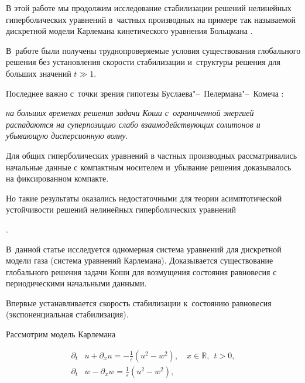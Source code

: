 \newpage




В этой работе мы продолжим исследование стабилизации решений нелинейных гиперболических уравнений в~частных производных на примере так называемой дискретной модели Карлемана кинетического уравнения Больцмана \cite{duh:GodSul, duh:Broad, duh:veden, duh:VasDukRad16, duh:Karlm, duh:Boltz, duh:RVD1, duh:God62, duh:Ily, duh:dux}. 

В~работе \cite{duh:Ily} были получены труднопроверяемые условия существования глобального решения без установления скорости стабилизации и~структуры решения для больших значений $t\gg1$. 

Последнее важно с~точки зрения гипотезы Буслаева"--~Пелермана"--~Комеча \cite{duh:BKS, duh:KomKop}: 

{\sl на больших временах решения задачи Коши с~ограниченной энергией распадаются на суперпозицию слабо взаимодействующих солитонов и убывающую дисперсионную волну}.  

Для общих гиперболических уравнений в частных производных рассматривались начальные данные с компактным носителем и~убывание решения доказывалось на фиксированном компакте. 

Но такие результаты оказались недостаточными для теории асимптотической устойчивости решений нелинейных гиперболических уравнений

\cite{duh:BKS, duh:KomKop, duh:Kom1, duh:Kop12}. 

В~данной статье исследуется одномерная система уравнений для дискретной модели газа (система уравнений Карлемана). Доказывается существование глобального решения задачи Коши для возмущения состояния равновесия с периодическими начальными данными. 

Впервые устанавливается скорость стабилизации к~состоянию равновесия (экспоненциальная стабилизация).



\smallskip



 Рассмотрим модель Карлемана

\begin{equation}

  \begin{split}

    \partial_t&u+\partial_xu=-\frac1\varepsilon(u^2-w^2),\quad x\in \mathbb R,~~t>0,\label{duh:KarlemS}\\

    \partial_t&w-\partial_xw=\frac1\varepsilon(u^2-w^2),

  \end{split}

\end{equation}

